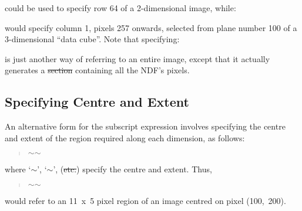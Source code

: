 \small
\begin{quote}
\begin{center}
\end{center}
\end{quote}
\normalsize

could be used to specify row 64 of a 2-dimensional image, while:

\small
\begin{quote}
\begin{center}
\end{center}
\end{quote}
\normalsize

would specify column 1, pixels 257 onwards, selected from plane number
100 of a 3-dimensional ``data cube''.
Note that specifying:

\small
\begin{quote}
\begin{center}
\end{center}
\end{quote}
\normalsize

is just another way of referring to an entire image, except that it actually
generates a \st{section\/} containing all the NDF's pixels.

\subsection{Specifying Centre and Extent}

An alternative form for the subscript expression involves specifying the centre
and extent of the region required along each dimension, as follows:

\small
\begin{quote}
\begin{center}
$\sim$$\sim$
\end{center}
\end{quote}
\normalsize

where `$\sim$', `$\sim$', (\st{etc.}) specify the
centre and extent. Thus,

\small
\begin{quote}
\begin{center}
$\sim$$\sim$
\end{center}
\end{quote}
\normalsize

would refer to an 11~x~5 pixel region of an image centred on pixel (100,~200).

